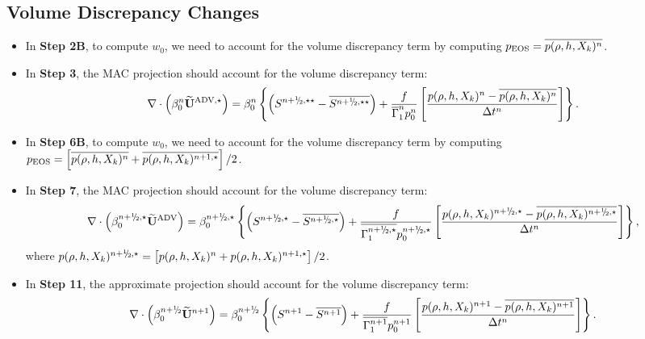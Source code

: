 \subsection{Volume Discrepancy Changes}
\begin{itemize}
\item In {\bf Step 2B}, to compute $w_0$, we need to account for the volume discrepancy
term by computing $p_{\rm EOS} = \overline{p(\rho,h,X_k)^n}$.
\item In {\bf Step 3}, the MAC projection should account for the volume discrepancy term:
\begin{equation}
\nabla \cdot \left(\beta_0^n \uadvone\right) = 
\beta_0^n \left\{ \left(S^{\nph,\star\star} - \overline{S^{\nph,\star\star}}\right)
+ \frac{f}{\gammabar^n p_0^n}
\left[\frac{p(\rho,h,X_k)^n - \overline{p(\rho,h,X_k)^n}}{\Delta t^n}\right]\right\}.
\end{equation}
\item In {\bf Step 6B}, to compute $w_0$, we need to account for the volume discrepancy
term by computing $p_{\rm EOS} = \left[\overline{p(\rho,h,X_k)^n} + \overline{p(\rho,h,X_k)^{n+1,\star}}\right]/2$.
\item In {\bf Step 7}, the MAC projection should account for the volume discrepancy term:
\begin{equation}
\nabla \cdot \left(\beta_0^{\nph,\star} \uadvtwo\right) = \beta_0^{\nph,\star}\left\{\left(S^{\nph,\star} - \overline{S^{\nph,\star}}\right) + \frac{f}{\overline{\Gamma_1^{\nph,\star}} p_0^{\nph,\star}} \left[\frac{p(\rho,h,X_k)^{\nph,\star} - \overline{p(\rho,h,X_k)^{\nph,\star}}}{\Delta t^n}\right]\right\},
\end{equation}
where $p(\rho,h,X_k)^{\nph,\star} = \left[p(\rho,h,X_k)^n +p(\rho,h,X_k)^{n+1,\star}\right]/2$.
\item In {\bf Step 11}, the approximate projection should account for the volume
discrepancy term:
\begin{equation}
\nabla \cdot \left(\beta_0^{\nph} \Ubt^{n+1} \right)  = \beta_0^{\nph}\left\{  \left(S^{n+1} - \overline{S^{n+1}} \right)
+ \frac{f}{\overline{\Gamma_1^{n+1}} p_0^{n+1}}
\left[\frac{p(\rho,h,X_k)^{n+1} - \overline{p(\rho,h,X_k)^{n+1}}}{\Delta t^n}\right]\right\}.
\end{equation}
\end{itemize}
